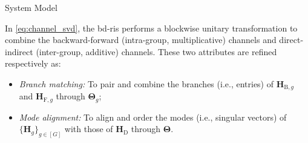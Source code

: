 \documentclass[journal]{IEEEtran}
\begin{document}
\begin{section}{System Model}
		\begin{remark}
			In \eqref{eq:channel_svd}, the \gls{bd}-\gls{ris} performs a blockwise unitary transformation to combine the backward-forward (intra-group, multiplicative) channels and direct-indirect (inter-group, additive) channels.
			These two attributes are refined respectively as:
			\begin{itemize}
				\item \emph{Branch matching:} To pair and combine the branches (i.e., entries) of $\mathbf{H}_{\mathrm{B},g}$ and $\mathbf{H}_{\mathrm{F},g}$ through $\mathbf{\Theta}_g$;
				\item \emph{Mode alignment:} To align and order the modes (i.e., singular vectors) of $\{\mathbf{H}_g\}_{g \in [G]}$ with those of $\mathbf{H}_\mathrm{D}$ through $\mathbf{\Theta}$.
			\end{itemize}
		\end{remark}


\end{section}
\end{document}
